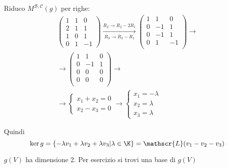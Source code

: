 {	Riduco $ M^{\mathscr{B}, \mathscr{C}}(g) $ per righe:
	\begin{gather*}
		\begin{pmatrix}
			1 & 1 & 0\\
			2 & 1 & 1\\
			1 & 0 & 1\\
			0 & 1 & -1
		\end{pmatrix} \xrightarrow[R_{3} \to R_3-R_1 ]{R_{2}\to R_{2}-2R_1} \begin{pmatrix}
			1 & 1 & 0\\
			0 & -1 & 1\\
			0 & -1 & 1\\
			0 & 1 & -1\\
		\end{pmatrix}\to \\
		\to \begin{pmatrix}
			1 & 1 & 0\\
			0 & -1 & 1\\
			0 & 0 & 0\\
			0 & 0 & 0\\
		\end{pmatrix}\to\\ \to \begin{cases}
		x_1+x_2=0\\
		x_2-x_3=0	
		\end{cases}
		\to \begin{cases}
			x_1=- \lambda\\
			x_2= \lambda\\
			x_3= \lambda
		\end{cases}
	\end{gather*}

	Quindi \[ \ker g =\{- \lambda v_1+ \lambda v_2+ \lambda v_3 | \lambda \in\K\}= \mathscr{L}(v_1-v_2-v_3)\]

	$ g(V) $ ha dimensione 2. Per esercizio si trovi una base di $ g(V) $ %
}


